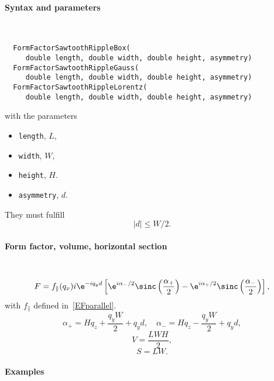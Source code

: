 \FloatBarrier

\paragraph{Syntax and parameters}\strut\\[-2ex plus .2ex minus .2ex]
\begin{lstlisting}
  FormFactorSawtoothRippleBox(
     double length, double width, double height, asymmetry)
  FormFactorSawtoothRippleGauss(
     double length, double width, double height, asymmetry)
  FormFactorSawtoothRippleLorentz(
     double length, double width, double height, asymmetry)
\end{lstlisting}
with the parameters
\begin{itemize}
\item \texttt{length}, $L$,
\item \texttt{width}, $W$,
\item \texttt{height}, $H$.
\item \texttt{asymmetry}, $d$.
\end{itemize}
They must fulfill
\begin{displaymath}
  |d| \le W/2.
\end{displaymath}

\paragraph{Form factor, volume, horizontal section}\strut\\
\begin{equation*}
  F = f_\parallel(q_x)
  i\e^{-i q_y d}
  \left[
    \e^{i \alpha_{-}/2} \sinc\left( \frac{\alpha_{+}}{2} \right)
    - \e^{i \alpha_{+}/2} \sinc\left( \frac{\alpha_{-}}{2} \right)
  \right],
\end{equation*}
with $f_\parallel$ defined in~\cref{EFparallel}.
\begin{equation*}
  \alpha_{+} = H q_z + \frac{q_y W}{2} + q_y d, \quad
  \alpha_{-} = H q_z - \frac{q_y W}{2} + q_y d,
\end{equation*}
\begin{equation*}
  V = \dfrac{L W H}{2},
\end{equation*}
\begin{equation*}
  S = L W.
\end{equation*}

\paragraph{Examples}\strut

